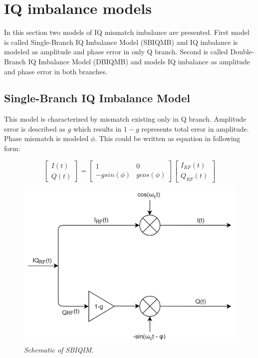 \documentclass[en,printmode]{mgr}
\begin{document}
	\newpage
	\section{IQ imbalance models}
		In this section two models of IQ mismatch imbalance are presented. First model is called 
		Single-Branch IQ Imbalance Model (SBIQMB) and IQ imbalance is modeled as amplitude and phase
		error in only Q branch. Second is called Double-Branch IQ Imbalance Model (DBIQMB) and 
		models IQ imbalance as amplitude and phase error in both branches.
		
		\subsection*{Single-Branch IQ Imbalance Model}
			This model is characterized by mismatch existing only in Q branch. Amplitude error is
			described as $g$ which results in $1-g$ represents total error in amplitude. Phase mismatch
			is modeled $\phi$. This could be written as equation in following form:
			
		\begin{equation}
			\begin{bmatrix}
				I(t) \\
				Q(t)
			\end{bmatrix}
			=
			\begin{bmatrix}
				1 & 0 \\
				-g sin(\phi) & g cos(\phi)
			\end{bmatrix}
			\begin{bmatrix}
				I_{RF}(t) \\
				Q_{RF}(t)
			\end{bmatrix} \label{eq:SBIQIM}
		\end{equation}
		
		\begin{figure}[!htb]
    		\centering
   			\includegraphics[width=\textwidth]{diag/sbiq.png}
    		\caption{\textit{Schematic of SBIQIM.}}
		\end{figure}
		
\end{document}
